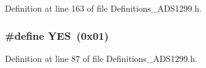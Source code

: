 Definition at line 163 of file Definitions\+\_\+\+A\+D\+S1299.\+h.

\subsubsection[{\texorpdfstring{Y\+ES}{YES}}]{\setlength{\rightskip}{0pt plus 5cm}\#define Y\+ES~(0x01)}\hypertarget{group__Definitions__ADS1299_ga7ebc9a785e5ab85457c98595aac81589}{}\label{group__Definitions__ADS1299_ga7ebc9a785e5ab85457c98595aac81589}


Definition at line 87 of file Definitions\+\_\+\+A\+D\+S1299.\+h.

